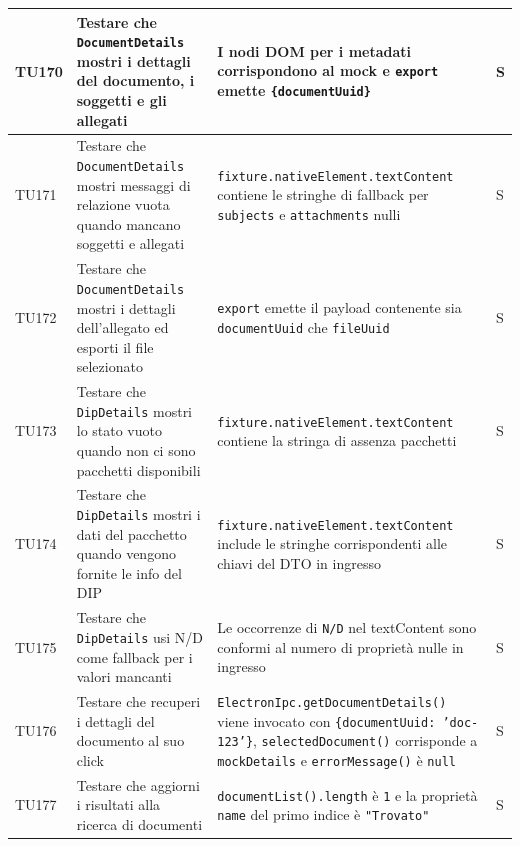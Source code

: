 \documentclass[a4paper,12pt]{article}
\begin{document}
\begin{longtable}{|M{1.2cm}|M{5cm}|M{8cm}|M{1.5cm}|}
            TU170 & Testare che \texttt{DocumentDetails} mostri i dettagli del documento, i soggetti e gli allegati & I nodi DOM per i metadati corrispondono al mock e \texttt{export} emette \texttt{\{documentUuid\}} & S \\ 
            \hline
            
            TU171 & Testare che \texttt{DocumentDetails} mostri messaggi di relazione vuota quando mancano soggetti e allegati & \texttt{fixture.nativeElement.textContent} contiene le stringhe di fallback per \texttt{subjects} e \texttt{attachments} nulli & S \\ 
            \hline
            
            TU172 & Testare che \texttt{DocumentDetails} mostri i dettagli dell'allegato ed esporti il file selezionato & \texttt{export} emette il payload contenente sia \texttt{documentUuid} che \texttt{fileUuid} & S \\ 
            \hline
            
            TU173 & Testare che \texttt{DipDetails} mostri lo stato vuoto quando non ci sono pacchetti disponibili & \texttt{fixture.nativeElement.textContent} contiene la stringa di assenza pacchetti & S \\ 
            \hline
            
            TU174 & Testare che \texttt{DipDetails} mostri i dati del pacchetto quando vengono fornite le info del DIP & \texttt{fixture.nativeElement.textContent} include le stringhe corrispondenti alle chiavi del DTO in ingresso & S \\ 
            \hline
            
            TU175 & Testare che \texttt{DipDetails} usi N/D come fallback per i valori mancanti & Le occorrenze di \texttt{N/D} nel textContent sono conformi al numero di proprietà nulle in ingresso & S \\ 
            \hline

            TU176 & Testare che \texttt{} recuperi i dettagli del documento al suo click & \texttt{ElectronIpc.getDocumentDetails()} viene invocato con \texttt{\{documentUuid: 'doc-123'\}}, \texttt{selectedDocument()} corrisponde a \texttt{mockDetails} e \texttt{errorMessage()} è \texttt{null} & S \\ 
            \hline
            
            TU177 & Testare che \texttt{} aggiorni i risultati alla ricerca di documenti & \texttt{documentList().length} è \texttt{1} e la proprietà \texttt{name} del primo indice è \texttt{"Trovato"} & S \\ 
            \hline
            

\end{longtable}
\end{document}
